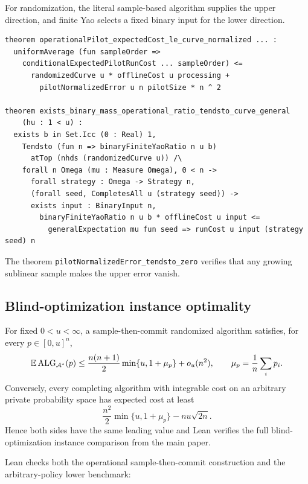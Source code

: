 For randomization, the literal sample-based algorithm supplies the upper direction,
and finite Yao selects a fixed binary input for the lower direction.

\begin{lstlisting}[style=lean]
theorem operationalPilot_expectedCost_le_curve_normalized ... :
  uniformAverage (fun sampleOrder =>
    conditionalExpectedPilotRunCost ... sampleOrder) <=
      randomizedCurve u * offlineCost u processing +
        pilotNormalizedError u n pilotSize * n ^ 2

theorem exists_binary_mass_operational_ratio_tendsto_curve_general
    (hu : 1 < u) :
  exists b in Set.Icc (0 : Real) 1,
    Tendsto (fun n => binaryFiniteYaoRatio n u b)
      atTop (nhds (randomizedCurve u)) /\
    forall n Omega (mu : Measure Omega), 0 < n ->
      forall strategy : Omega -> Strategy n,
      (forall seed, CompletesAll u (strategy seed)) ->
      exists input : BinaryInput n,
        binaryFiniteYaoRatio n u b * offlineCost u input <=
          generalExpectation mu fun seed => runCost u input (strategy seed) n
\end{lstlisting}

The theorem \texttt{pilotNormalizedError\_tendsto\_zero} verifies that any
growing sublinear sample makes the upper error vanish.

\subsection{Blind-optimization instance optimality}

\begin{theorem}
\label{thm:lean-audit-blind-optimization-instance}
For fixed $0<u<\infty$, a sample-then-commit randomized algorithm satisfies,
for every $p\in[0,u]^n$,
\[
 \mathbb{E}\operatorname{ALG}_{\mathcal A^*}(p)
 \le \frac{n(n+1)}2\min\{u,1+\mu_p\}+o_u(n^2),
 \qquad \mu_p=\frac1n\sum_i p_i.
\]
Conversely, every completing algorithm with integrable cost on an arbitrary
private probability space has
expected cost at least
\[
 \frac{n^2}{2}\min\{u,1+\mu_p\}-nu\sqrt{2n}.
\]
Hence both sides have the same leading value and Lean verifies the full
blind-optimization instance comparison from the main paper.
\end{theorem}

Lean checks both the operational sample-then-commit construction and the
arbitrary-policy lower benchmark:

